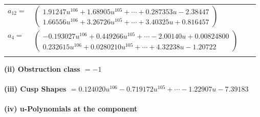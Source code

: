 \documentclass[1p]{elsarticle_modified}
\theoremstyle{definition}
\begin{document}
\begin{tabular}{m{7pt} m{180pt} m{7pt} m{180pt} }
\flushright $a_{12}=$&$\begin{pmatrix}1.91247 u^{106}+1.68905 u^{105}+\cdots+0.287353 u-2.38447\\1.66556 u^{106}+3.26726 u^{105}+\cdots+3.40325 u+0.816457\end{pmatrix}$ \\
\flushright $a_{4}=$&$\begin{pmatrix}-0.193027 u^{106}+0.449266 u^{105}+\cdots-2.00140 u+0.00824800\\0.232615 u^{106}+0.0280210 u^{105}+\cdots+4.32238 u-1.20722\end{pmatrix}$\\&\end{tabular}
\flushleft \textbf{(ii) Obstruction class $= -1$}\\~\\
\flushleft \textbf{(iii) Cusp Shapes $= 0.124020 u^{106}-0.719172 u^{105}+\cdots-1.22907 u-7.39183$}\\~\\
\newpage\renewcommand{\arraystretch}{1}
\flushleft \textbf{(iv) u-Polynomials at the component}\newline \\
\end{document}
